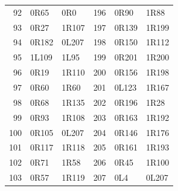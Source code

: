 \begin{longtable}{@{}rll@{\hspace{24pt}}rll@{}}
92 & 0R65 & 0R0 & 196 & 0R90 & 1R88\\
93 & 0R27 & 1R107 & 197 & 0R139 & 1R199\\
94 & 0R182 & 0L207 & 198 & 0R150 & 1R112\\
95 & 1L109 & 1L95 & 199 & 0R201 & 1R200\\
96 & 0R19 & 1R110 & 200 & 0R156 & 1R198\\
97 & 0R60 & 1R60 & 201 & 0L123 & 1R167\\
98 & 0R68 & 1R135 & 202 & 0R196 & 1R28\\
99 & 0R93 & 1R108 & 203 & 0R163 & 1R192\\
100 & 0R105 & 0L207 & 204 & 0R146 & 1R176\\
101 & 0R117 & 1R118 & 205 & 0R161 & 1R193\\
102 & 0R71 & 1R58 & 206 & 0R45 & 1R100\\
103 & 0R57 & 1R119 & 207 & 0L4 & 0L207\\
\end{longtable}
\endgroup
